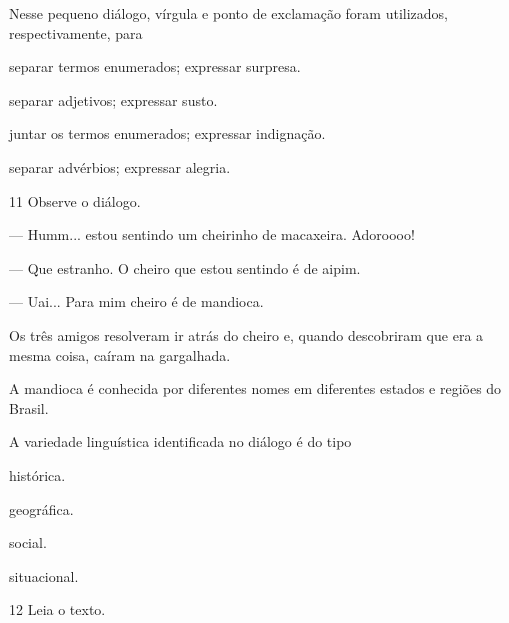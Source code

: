 Nesse pequeno diálogo, vírgula e ponto de exclamação foram utilizados,
respectivamente, para

\begin{escolha}
\item separar termos enumerados; expressar surpresa.

\item separar adjetivos; expressar susto.

\item juntar os termos enumerados; expressar indignação.

\item separar advérbios; expressar alegria.
\end{escolha}

\num{11} Observe o diálogo.

\begin{myquote}
--- Humm... estou sentindo um cheirinho de macaxeira. Adoroooo!

--- Que estranho. O cheiro que estou sentindo é de aipim.

--- Uai... Para mim cheiro é de mandioca.

Os três amigos resolveram ir atrás do cheiro e, quando descobriram que
era a mesma coisa, caíram na gargalhada.

\end{myquote}

A mandioca é conhecida por diferentes nomes em diferentes
estados e regiões do Brasil.

A variedade linguística identificada no diálogo é do tipo

\begin{escolha}
\item histórica.

\item geográfica.

\item social.

\item situacional.
\end{escolha}


\num{12} Leia o texto.

